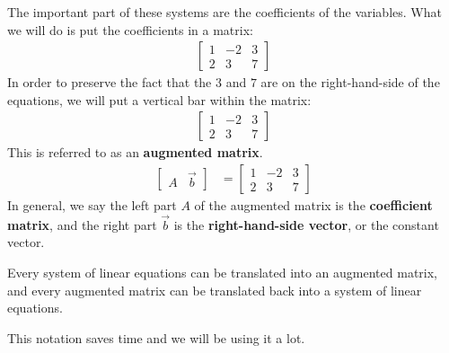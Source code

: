 \documentclass[11pt]{article}
\newcommand{\keyphrase}{\textbf}
\begin{document}
The important part of these systems are the coefficients of the variables. What we will do is put the coefficients in a matrix:
\begin{align*}
\left[ \begin{matrix}
1 & -2 & 3
\\
2 & 3 & 7
\end{matrix} \right]
\end{align*}
In order to preserve the fact that the $3$ and $7$ are on the right-hand-side of the equations, we will put a vertical bar within the matrix:
\begin{align*}
\left[ \begin{matrix}
1 & -2 & 3
\\
2 & 3 & 7
\end{matrix} \right]
\end{align*}
This is referred to as an \keyphrase{augmented matrix}. 
\begin{align*}
\left[
\begin{matrix}
A & \vec{b}
\end{matrix}
\right]
&=
\left[\begin{matrix} 1 &-2 & 3 \\ 2 & 3 & 7 \end{matrix}\right]

\end{align*}
In general, we say the left part $A$ of the augmented matrix is the \keyphrase{coefficient matrix}, and the right part $\vec{b}$ is the \keyphrase{right-hand-side vector}, or the constant vector.

Every system of linear equations can be translated into an augmented matrix, and every augmented matrix can be translated back into a system of linear equations.

This notation saves time and we will be using it a lot.
\end{document}
